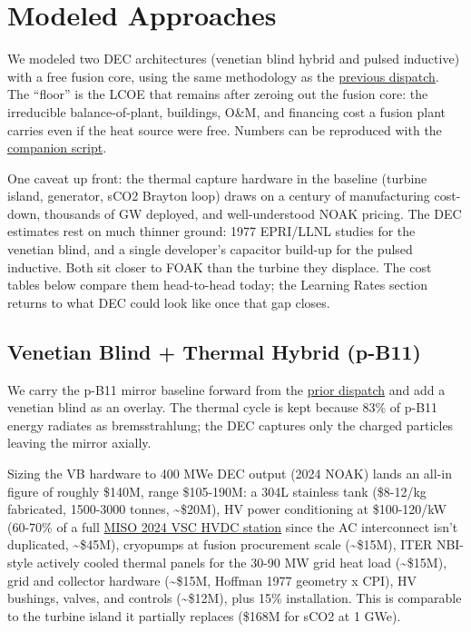 \documentclass{article}
\begin{document}
\section{Modeled Approaches}\label{modeled-approaches}

We modeled two DEC architectures (venetian blind hybrid and pulsed
inductive) with a free fusion core, using the same methodology as the
\href{https://1cf.energy/fusions-cost-floor-what-if-the-core-were-free/}{previous
dispatch}. The ``floor'' is the LCOE that remains after zeroing out the
fusion core: the irreducible balance-of-plant, buildings, O\&M, and
financing cost a fusion plant carries even if the heat source were free.
Numbers can be reproduced with the
\href{https://github.com/1cfe/1costingfe/blob/master/examples/dec_blog_numbers.py}{companion
script}.

One caveat up front: the thermal capture hardware in the baseline
(turbine island, generator, sCO2 Brayton loop) draws on a century of
manufacturing cost-down, thousands of GW deployed, and well-understood
NOAK pricing. The DEC estimates rest on much thinner ground: 1977
EPRI/LLNL studies for the venetian blind, and a single developer's
capacitor build-up for the pulsed inductive. Both sit closer to FOAK
than the turbine they displace. The cost tables below compare them
head-to-head today; the Learning Rates section returns to what DEC could
look like once that gap closes.

\subsection{Venetian Blind + Thermal Hybrid (p-B11)}\label{venetian-blind-thermal-hybrid-p-b11}

We carry the p-B11 mirror baseline forward from the
\href{https://1cf.energy/fusions-cost-floor-what-if-the-core-were-free/}{prior
dispatch} and add a venetian blind as an overlay. The thermal cycle is
kept because 83\% of p-B11 energy radiates as bremsstrahlung; the DEC
captures only the charged particles leaving the mirror axially.

Sizing the VB hardware to 400 MWe DEC output (2024 NOAK) lands an all-in
figure of roughly \$140M, range \$105-190M: a 304L stainless tank
(\$8-12/kg fabricated, 1500-3000 tonnes, \textasciitilde\$20M), HV power
conditioning at \$100-120/kW (60-70\% of a full
\href{https://cdn.misoenergy.org/20240501\%20PSC\%20Item\%2004\%20MISO\%20Transmission\%20Cost\%20Estimation\%20Guide\%20for\%20MTEP24632680.pdf}{MISO
2024 VSC HVDC station} since the AC interconnect isn't duplicated,
\textasciitilde\$45M), cryopumps at fusion procurement scale
(\textasciitilde\$15M), ITER NBI-style actively cooled thermal panels
for the 30-90 MW grid heat load (\textasciitilde\$15M), grid and
collector hardware (\textasciitilde\$15M, Hoffman 1977 geometry x CPI),
HV bushings, valves, and controls (\textasciitilde\$12M), plus 15\%
installation. This is comparable to the turbine island it partially
replaces (\$168M for sCO2 at 1 GWe).
\end{document}
